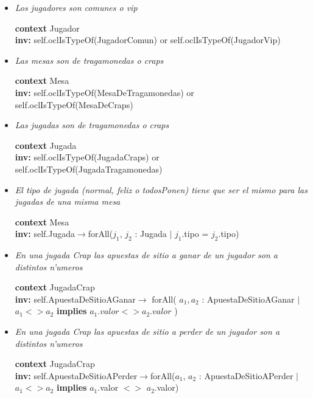 \begin{itemize}
\item \textit{Los jugadores son comunes o vip}

\textbf{context}  Jugador \\ \textbf{inv:} 
  self.oclIsTypeOf(JugadorComun) or self.oclIsTypeOf(JugadorVip)


\item \textit{Las mesas son de tragamonedas o craps}

\textbf{context}  Mesa \\ \textbf{inv:} 
  self.oclIsTypeOf(MesaDeTragamonedas) or self.oclIsTypeOf(MesaDeCraps)


\item \textit{Las jugadas son de tragamonedas o craps}

\textbf{context}  Jugada \\ \textbf{inv:} 
  self.oclIsTypeOf(JugadaCraps) or self.oclIsTypeOf(JugadaTragamonedas)


\item\textit{ El tipo de jugada (normal, feliz o todosPonen) tiene que ser el mismo para las jugadas de una misma mesa}

\textbf{context}  Mesa \\ \textbf{inv:} 
  self.Jugada$\rightarrow$forAll($j_{1}$, $j_{2}$ : Jugada $|$ $j_{1}$.tipo = $j_{2}$.tipo)


\item\textit{ En una jugada Crap las apuestas de sitio a ganar de un jugador son a distintos n'umeros}

\textbf{context}  JugadaCrap \\ \textbf{inv:} 
  self.ApuestaDeSitioAGanar$\rightarrow$ forAll( $a_{1}, a_{2}$ : ApuestaDeSitioAGanar $ | $ $ a_{1} <> a_{2} $  \textbf{implies} $ a_{1}.valor <> a_{2}.valor $ )


\item\textit{ En una jugada Crap las apuestas de sitio a perder de un jugador son a distintos n'umeros}

\textbf{context}  JugadaCrap \\ \textbf{inv:} 
  self.ApuestaDeSitioAPerder$\rightarrow$forAll($a_{1}$, $a_{2}$ : ApuestaDeSitioAPerder  $ | $ $a_{1} <> a_{2} $ \textbf{implies} $a_{1}$.valor $<>$ $a_{2}$.valor)

\end{itemize}
